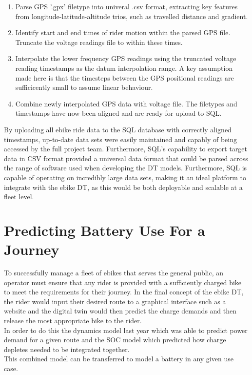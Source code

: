 \documentclass[a4paper, 10pt]{article}
\numberwithin{equation}{section}
\begin{document}
\begin{enumerate}
    \item Parse GPS '.gpx' filetype into univeral .csv format, extracting key features from longitude-latitude-altitude trios, such as travelled distance and gradient.
    \item Identify start and end times of rider motion within the parsed GPS file. Truncate the voltage readings file to within these times.
    \item Interpolate the lower frequency GPS readings using the truncated voltage reading timestamps as the datum interpolation range. A key assumption made here is that the timesteps between the GPS positional readings are sufficicently small to assume linear behaviour.
    \item Combine newly interpolated GPS data with voltage file. The filetypes and timestamps have now been aligned and are ready for upload to SQL.
\end{enumerate}

By uploading all ebike ride data to the SQL database with correctly aligned timestamps, up-to-date data sets were easily maintained and capably of being accessed by the full project team. Furthermore, SQL's capability to export target data in CSV format provided a universal data format that could be parsed across the range of software used when developing the DT models. Furthermore, SQL is capable of operating on incredibly large data sets, making it an ideal platform to integrate with the ebike DT, as this would be both deployable and scalable at a fleet level.

\section{Predicting Battery Use For a Journey}
\label{sec:soc_dynamics_modeldev}

To successfully manage a fleet of ebikes that serves the general public, an operator must ensure that any rider is provided with a sufficiently charged bike to meet the requirements for their journey. In the final concept of the ebike DT, the rider would input their desired route to a graphical interface such as a website and the digital twin would then predict the charge demands and then release the most appropriate bike to the rider.
\\
In order to do this the dynamics model last year which was able to predict power demand for a given route and the SOC model which predicted how charge depletes needed to be integrated together.
\\
This combined model can be transferred to model a battery in any given use case.
\end{document}
